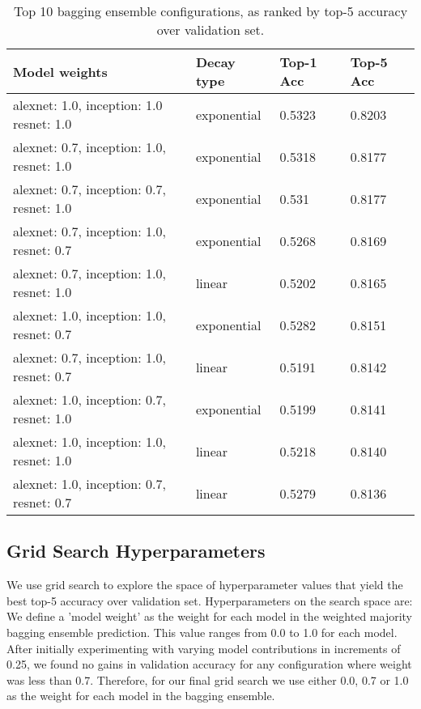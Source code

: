 \begin{table*}[!htb]
\small
\centering
 \begin{tabular}{|p{7cm}|p{3cm}|p{1.5cm}|p{1.5cm}|}
 \hline
Model weights & Decay type & Top-1 Acc & Top-5 Acc\\\hline\hline
alexnet: 1.0,
inception: 1.0
resnet: 1.0 & exponential & 0.5323 & 0.8203 \\\hline
alexnet: 0.7,
inception: 1.0,
resnet: 1.0 & exponential & 0.5318 & 0.8177 \\\hline
alexnet: 0.7,
inception: 0.7,
resnet: 1.0 & exponential & 0.531 & 0.8177 \\\hline
alexnet: 0.7,
inception: 1.0,
resnet: 0.7 & exponential & 0.5268 & 0.8169 \\\hline
alexnet: 0.7,
inception: 1.0,
resnet: 1.0 & linear & 0.5202 & 0.8165 \\\hline
alexnet: 1.0,
inception: 1.0,
resnet: 0.7 & exponential & 0.5282 & 0.8151 \\\hline
alexnet: 0.7,
inception: 1.0,
resnet: 0.7 & linear & 0.5191 & 0.8142 \\\hline
alexnet: 1.0,
inception: 0.7,
resnet: 1.0 & exponential & 0.5199 & 0.8141 \\\hline
alexnet: 1.0,
inception: 1.0,
resnet: 1.0 & linear & 0.5218 & 0.8140 \\\hline
alexnet: 1.0,
inception: 0.7,
resnet: 0.7 & linear & 0.5279 & 0.8136 \\\hline
\end{tabular}
\caption{Top 10 bagging ensemble configurations, as ranked by top-5 accuracy over validation set.}
\label{tab:top10_configs}
\end{table*}

\subsection{Grid Search Hyperparameters}

We use grid search to explore the space of hyperparameter values that yield the best top-5 accuracy over validation set. Hyperparameters on the search space are:\\

 We define a 'model weight' as the weight for each model in the weighted majority bagging ensemble prediction. This value ranges from 0.0 to 1.0 for each model.  After initially experimenting with varying model contributions in increments of 0.25, we found no gains in validation accuracy for any configuration where weight was less than 0.7.  Therefore, for our final grid search we use either 0.0, 0.7 or 1.0 as the weight for each model in the bagging ensemble.\\

